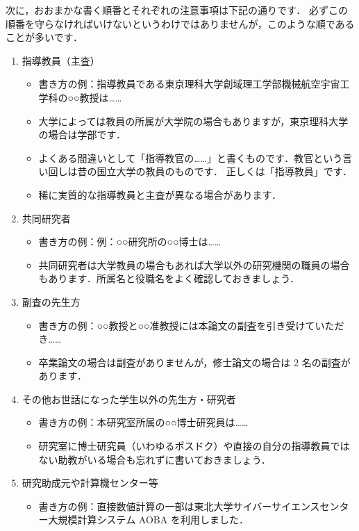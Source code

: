 次に，おおまかな書く順番とそれぞれの注意事項は下記の通りです．
必ずこの順番を守らなければいけないというわけではありませんが，このような順であることが多いです．
\begin{enumerate}
    \item 指導教員（主査）
    \begin{itemize}
        \item 書き方の例：指導教員である東京理科大学創域理工学部機械航空宇宙工学科の○○教授は……
        \item 大学によっては教員の所属が大学院の場合もありますが，東京理科大学の場合は学部です．
        \item よくある間違いとして「指導教官の……」と書くものです．教官という言い回しは昔の国立大学の教員のものです．
        正しくは「指導教員」です．
        \item 稀に実質的な指導教員と主査が異なる場合があります．
    \end{itemize}
    \item 共同研究者
    \begin{itemize}
        \item 書き方の例：例：○○研究所の○○博士は……
        \item 共同研究者は大学教員の場合もあれば大学以外の研究機関の職員の場合もあります．所属名と役職名をよく確認しておきましょう．
    \end{itemize}
    \item 副査の先生方
    \begin{itemize}
        \item 書き方の例：○○教授と○○准教授には本論文の副査を引き受けていただき……
        \item 卒業論文の場合は副査がありませんが，修士論文の場合は 2 名の副査があります．
    \end{itemize}
    \item その他お世話になった学生以外の先生方・研究者
    \begin{itemize}
        \item 書き方の例：本研究室所属の○○博士研究員は……
        \item 研究室に博士研究員（いわゆるポスドク）や直接の自分の指導教員ではない助教がいる場合も忘れずに書いておきましょう．
    \end{itemize}
    \item 研究助成元や計算機センター等
    \begin{itemize}
        \item 書き方の例：直接数値計算の一部は東北大学サイバーサイエンスセンター大規模計算システム AOBA を利用しました．

\end{itemize}
\end{enumerate}
